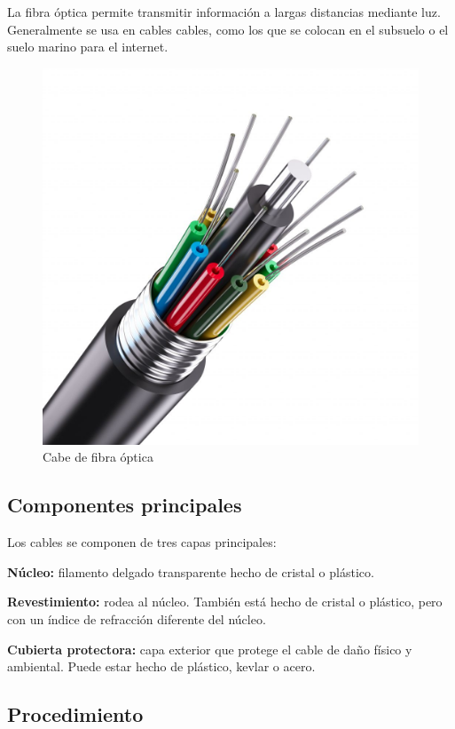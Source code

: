 La fibra óptica permite transmitir información a largas distancias mediante luz. Generalmente se usa en cables cables, como los que se colocan en el subsuelo o el suelo marino para el internet.

\begin{figure}[H]
  \centering
  \includegraphics[scale=0.3]{imagenes/fibra_optica.png}
  \caption{Cabe de fibra óptica\cite{nmcfibopt}}
\end{figure}

\subsection{Componentes principales}

Los cables se componen de tres capas principales:

\textbf{Núcleo:} filamento delgado transparente hecho de cristal o plástico.

\textbf{Revestimiento:} rodea al núcleo. También está hecho de cristal o plástico, pero con un índice de refracción diferente del núcleo.

\textbf{Cubierta protectora:} capa exterior que protege el cable de daño físico y ambiental. Puede estar hecho de plástico, kevlar o acero.

\subsection{Procedimiento}

